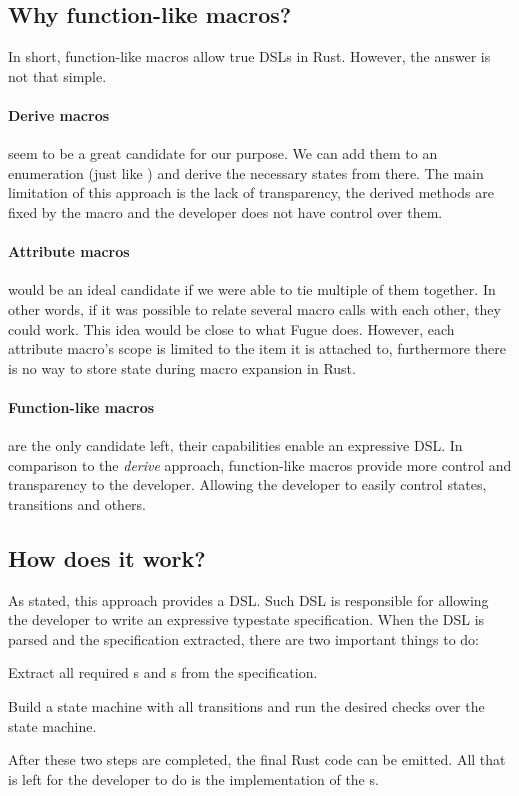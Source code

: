 \subsection{Why function-like macros?}

In short, function-like macros allow true DSLs in Rust. However, the answer is not that simple.

\paragraph{Derive macros} seem to be a great candidate for our purpose.
We can add them to an enumeration (just like \autocite{Fitzgerald2019}) and derive the necessary states from there.
The main limitation of this approach is the lack of transparency,
the derived methods are fixed by the macro and the developer does not have control over them.

\paragraph{Attribute macros} would be an ideal candidate if we were able to tie multiple of them together.
In other words, if it was possible to relate several macro calls with each other, they could work.
This idea would be close to what Fugue \autocite{DeLine2004} does.
However, each attribute macro's scope is limited to the item it is attached to,
furthermore there is no way to store state during macro expansion in Rust.

\paragraph{Function-like macros} are the only candidate left, their capabilities enable an expressive DSL.
In comparison to the \emph{derive} approach, function-like macros provide more control and transparency to the developer.
Allowing the developer to easily control states, transitions and others.

\subsection{How does it work?}

As stated, this approach provides a DSL.
Such DSL is responsible for allowing the developer to write an expressive typestate specification.
When the DSL is parsed and the specification extracted, there are two important things to do:
\begin{compactenum}
    \item Extract all required s and s from the specification.
    \item Build a state machine with all transitions and run the desired checks over the state machine.
\end{compactenum}
After these two steps are completed, the final Rust code can be emitted.
All that is left for the developer to do is the implementation of the s.


